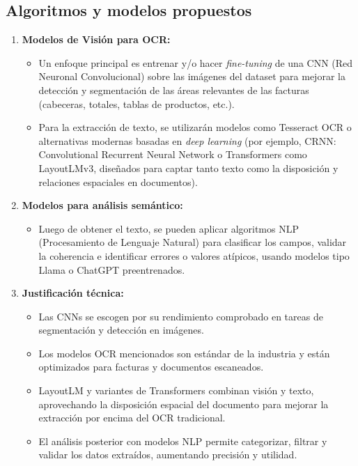 \documentclass[11pt,letterpaper]{article}
\begin{document}
	\subsection*{Algoritmos y modelos propuestos}
	\begin{enumerate}
		\item \textbf{Modelos de Visión para OCR:}
		\begin{itemize}
			\item Un enfoque principal es entrenar y/o hacer \textit{fine-tuning} de una CNN (Red Neuronal Convolucional) sobre las imágenes del dataset para mejorar la detección y segmentación de las áreas relevantes de las facturas (cabeceras, totales, tablas de productos, etc.).
			\item Para la extracción de texto, se utilizarán modelos como Tesseract OCR o alternativas modernas basadas en \textit{deep learning} (por ejemplo, CRNN: Convolutional Recurrent Neural Network o Transformers como LayoutLMv3, diseñados para captar tanto texto como la disposición y relaciones espaciales en documentos).
		\end{itemize}
		
		\item \textbf{Modelos para análisis semántico:}
		\begin{itemize}
			\item Luego de obtener el texto, se pueden aplicar algoritmos NLP (Procesamiento de Lenguaje Natural) para clasificar los campos, validar la coherencia e identificar errores o valores atípicos, usando modelos tipo Llama o ChatGPT preentrenados.
		\end{itemize}
		
		\item \textbf{Justificación técnica:}
		\begin{itemize}
			\item Las CNNs se escogen por su rendimiento comprobado en tareas de segmentación y detección en imágenes.
			\item Los modelos OCR mencionados son estándar de la industria y están optimizados para facturas y documentos escaneados.
			\item LayoutLM y variantes de Transformers combinan visión y texto, aprovechando la disposición espacial del documento para mejorar la extracción por encima del OCR tradicional.
			\item El análisis posterior con modelos NLP permite categorizar, filtrar y validar los datos extraídos, aumentando precisión y utilidad.
		\end{itemize}
	\end{enumerate}
	
\end{document}
